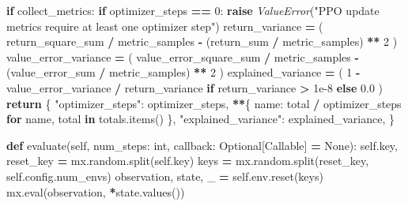 \documentclass[
  american,
  11pt,
  letterpaper,
]{article}
\newenvironment{Shaded}{\begin{snugshade}}{\end{snugshade}}
\newcommand{\BuiltInTok}[1]{#1}
\newcommand{\ControlFlowTok}[1]{\textcolor[rgb]{0.13,0.29,0.53}{\textbf{#1}}}
\newcommand{\DecValTok}[1]{\textcolor[rgb]{0.00,0.00,0.81}{#1}}
\newcommand{\FloatTok}[1]{\textcolor[rgb]{0.00,0.00,0.81}{#1}}
\newcommand{\KeywordTok}[1]{\textcolor[rgb]{0.13,0.29,0.53}{\textbf{#1}}}
\newcommand{\NormalTok}[1]{#1}
\newcommand{\OperatorTok}[1]{\textcolor[rgb]{0.81,0.36,0.00}{\textbf{#1}}}
\newcommand{\PreprocessorTok}[1]{\textcolor[rgb]{0.56,0.35,0.01}{\textit{#1}}}
\newcommand{\StringTok}[1]{\textcolor[rgb]{0.31,0.60,0.02}{#1}}
\newcommand{\VariableTok}[1]{\textcolor[rgb]{0.00,0.00,0.00}{#1}}
\renewenvironment{Shaded}{\par\smallskip}{\par\smallskip}
\begin{document}
\begin{Shaded}
\begin{Highlighting}[]
        \ControlFlowTok{if}\NormalTok{ collect\_metrics:}
            \ControlFlowTok{if}\NormalTok{ optimizer\_steps }\OperatorTok{==} \DecValTok{0}\NormalTok{:}
                \ControlFlowTok{raise} \PreprocessorTok{ValueError}\NormalTok{(}\StringTok{"PPO update metrics require at least one optimizer step"}\NormalTok{)}
\NormalTok{            return\_variance }\OperatorTok{=}\NormalTok{ (}
\NormalTok{                return\_square\_sum }\OperatorTok{/}\NormalTok{ metric\_samples}
                \OperatorTok{{-}}\NormalTok{ (return\_sum }\OperatorTok{/}\NormalTok{ metric\_samples) }\OperatorTok{**} \DecValTok{2}
\NormalTok{            )}
\NormalTok{            value\_error\_variance }\OperatorTok{=}\NormalTok{ (}
\NormalTok{                value\_error\_square\_sum }\OperatorTok{/}\NormalTok{ metric\_samples}
                \OperatorTok{{-}}\NormalTok{ (value\_error\_sum }\OperatorTok{/}\NormalTok{ metric\_samples) }\OperatorTok{**} \DecValTok{2}
\NormalTok{            )}
\NormalTok{            explained\_variance }\OperatorTok{=}\NormalTok{ (}
                \DecValTok{1} \OperatorTok{{-}}\NormalTok{ value\_error\_variance }\OperatorTok{/}\NormalTok{ return\_variance}
                \ControlFlowTok{if}\NormalTok{ return\_variance }\OperatorTok{\textgreater{}} \FloatTok{1e{-}8}
                \ControlFlowTok{else} \FloatTok{0.0}
\NormalTok{            )}
            \ControlFlowTok{return}\NormalTok{ \{}
                \StringTok{"optimizer\_steps"}\NormalTok{: optimizer\_steps,}
                \OperatorTok{**}\NormalTok{\{}
\NormalTok{                    name: total }\OperatorTok{/}\NormalTok{ optimizer\_steps}
                    \ControlFlowTok{for}\NormalTok{ name, total }\KeywordTok{in}\NormalTok{ totals.items()}
\NormalTok{                \},}
                \StringTok{"explained\_variance"}\NormalTok{: explained\_variance,}
\NormalTok{            \}}

    \KeywordTok{def}\NormalTok{ evaluate(}\VariableTok{self}\NormalTok{, num\_steps: }\BuiltInTok{int}\NormalTok{, callback: Optional[Callable] }\OperatorTok{=} \VariableTok{None}\NormalTok{):}
        \VariableTok{self}\NormalTok{.key, reset\_key }\OperatorTok{=}\NormalTok{ mx.random.split(}\VariableTok{self}\NormalTok{.key)}
\NormalTok{        keys }\OperatorTok{=}\NormalTok{ mx.random.split(reset\_key, }\VariableTok{self}\NormalTok{.config.num\_envs)}
\NormalTok{        observation, state, \_ }\OperatorTok{=} \VariableTok{self}\NormalTok{.env.reset(keys)}
\NormalTok{        mx.}\BuiltInTok{eval}\NormalTok{(observation, }\OperatorTok{*}\NormalTok{state.values())}


\end{Highlighting}
\end{Shaded}
\end{document}
